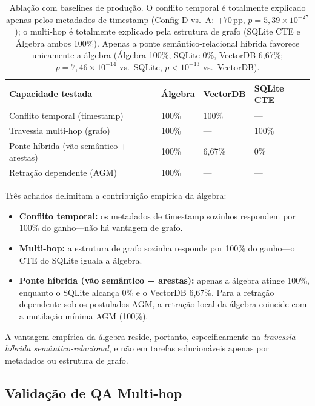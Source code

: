 \documentclass[11pt,a4paper]{article}
\theoremstyle{definition}
\begin{document}
\begin{table}[h]
\centering
\begin{tabular}{llll}
\toprule
\textbf{Capacidade testada} & \textbf{\'Algebra} & \textbf{VectorDB} & \textbf{SQLite CTE} \\
\midrule
Conflito temporal (timestamp) & 100\% & 100\% & --- \\
Travessia multi-hop (grafo) & 100\% & --- & 100\% \\
Ponte h\'ibrida (v\~ao sem\^antico + arestas) & 100\% & 6,67\% & 0\% \\
Retra\c{c}\~ao dependente (AGM) & 100\% & --- & --- \\
\bottomrule
\end{tabular}
\caption{Abla\c{c}\~ao com baselines de produ\c{c}\~ao. O conflito temporal \'e totalmente explicado apenas pelos metadados de timestamp (Config D vs.\ A: $+70$\,pp, $p = 5{,}39\times10^{-27}$); o multi-hop \'e totalmente explicado pela estrutura de grafo (SQLite CTE e \'Algebra ambos 100\%). Apenas a ponte sem\^antico-relacional h\'ibrida favorece unicamente a \'algebra (\'Algebra 100\%, SQLite 0\%, VectorDB 6,67\%; $p = 7{,}46\times10^{-14}$ vs.\ SQLite, $p < 10^{-13}$ vs.\ VectorDB).}
\label{tab:prod_baselines}
\end{table}

Tr\^es achados delimitam a contribui\c{c}\~ao emp\'irica da \'algebra:
\begin{itemize}
    \item \textbf{Conflito temporal:} os metadados de timestamp sozinhos respondem por 100\% do ganho---n\~ao h\'a vantagem de grafo.
    \item \textbf{Multi-hop:} a estrutura de grafo sozinha responde por 100\% do ganho---o CTE do SQLite iguala a \'algebra.
    \item \textbf{Ponte h\'ibrida (v\~ao sem\^antico + arestas):} apenas a \'algebra atinge 100\%, enquanto o SQLite alcan\c{c}a 0\% e o VectorDB 6,67\%. Para a retra\c{c}\~ao dependente sob os postulados AGM, a retra\c{c}\~ao local da \'algebra coincide com a mutila\c{c}\~ao m\'inima AGM (100\%).
\end{itemize}
A vantagem emp\'irica da \'algebra reside, portanto, especificamente na \emph{travessia h\'ibrida sem\^antico-relacional}, e n\~ao em tarefas solucion\'aveis apenas por metadados ou estrutura de grafo.

\subsection{Valida\c{c}\~ao de QA Multi-hop}
\end{document}
